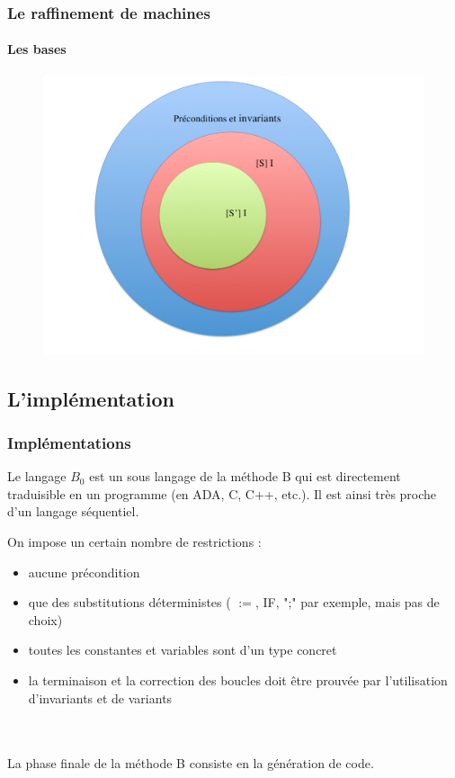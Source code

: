 \documentclass[11pt,a4paper,xcolor=table, handout]{beamer} %
\begin{document}
\begin{frame}
\frametitle{Le raffinement de machines}
\framesubtitle{Les bases}
\begin{figure}[h]
\centering
\includegraphics[scale=0.25]{ressources/cond.png}
\end{figure}
\end{frame}

\subsection{L'implémentation}
\begin{frame}
\frametitle{Implémentations}
Le langage $B_0$ est un sous langage de la méthode B qui est directement traduisible en un programme (en ADA, C, C++, etc.).  Il est ainsi très proche d'un langage séquentiel.

\pause

On impose un certain nombre de restrictions :
\begin{itemize}
\item aucune précondition
\pause
\item que des substitutions déterministes ( $:=$, \textsc{IF}, ";" par exemple, mais pas de choix)
\pause
\item toutes les constantes et variables sont d'un type concret
\pause
\item la terminaison et la correction des boucles doit être prouvée par l'utilisation d'invariants et de variants
\end{itemize}
~\\~\\\pause
La phase finale de la méthode B consiste en la génération de code.

\end{frame}
\end{document}

